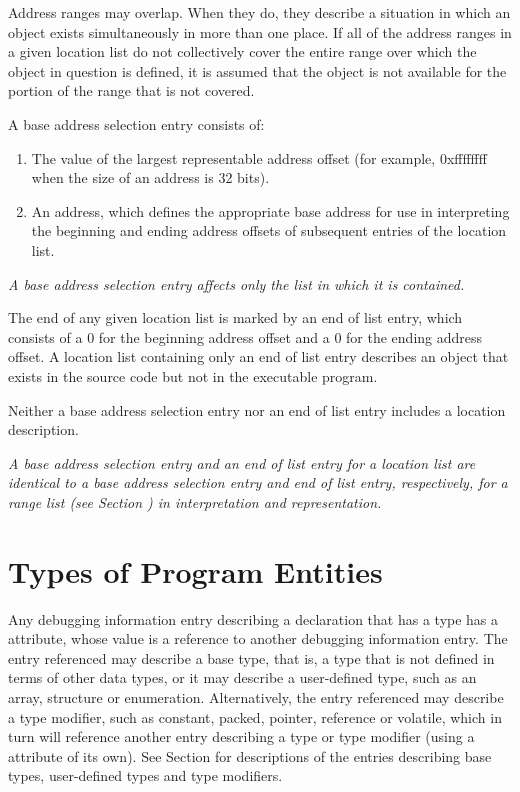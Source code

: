 Address ranges may overlap. When they do, they describe a
situation in which an object exists simultaneously in more than
one place. If all of the address ranges in a given location
list do not collectively cover the entire range over which the
object in question is defined, it is assumed that the object is
not available for the portion of the range that is not covered.

A base address selection entry consists of:
\begin{enumerate}[1]
\item The value of the largest representable 
address offset (for example, 0xffffffff when the size of
an address is 32 bits).
\item An address, which defines the 
appropriate base address for use in interpreting the beginning
and ending address offsets of subsequent entries of the location list.
\end{enumerate}


\textit{A base address selection entry 
affects only the list in which it is contained.}

The end of any given location list is marked by an end of
list entry, which consists of a 0 for the beginning address
offset and a 0 for the ending address offset. A location list
containing only an end of list entry describes an object that
exists in the source code but not in the executable program.

Neither a base address selection entry nor an end of list
entry includes a location description.

\textit{A base address selection entry and an end of list
entry for a location list are identical to a base address
selection entry and end of list entry, respectively, for a
range list 
(see Section ) 
in interpretation
and representation.}






\section{Types of Program Entities}
\label{chap:typesofprogramentities}
Any debugging information entry describing a declaration that
has a type has a  attribute, whose value is a
reference to another debugging information entry. The entry
referenced may describe a base type, that is, a type that is
not defined in terms of other data types, or it may describe a
user-defined type, such as an array, structure or enumeration.
Alternatively, the entry referenced may describe a type
modifier, such as constant, packed, pointer, reference or
volatile, which in turn will reference another entry describing
a type or type modifier (using a  attribute of its
own). See 
Section   
for descriptions of the entries describing
base types, user-defined types and type modifiers.



